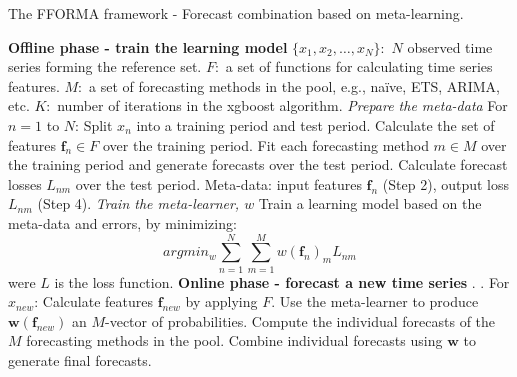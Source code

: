 \documentclass[11pt,a4paper,]{article}
\def\naive{na\"{i}ve}
\theoremstyle{definition}
\theoremstyle{definition}
\theoremstyle{definition}
\theoremstyle{remark}
\begin{document}
\begin{algorithm}[!ht]
  \caption{The FFORMA framework - Forecast combination based on meta-learning. }
  \label{alg:algo-lab}
  \begin{algorithmic}[1]
    \Statex \textbf{Offline phase - train the learning model}
    \Statex {}
    \Statex \hspace{1cm}$\{x_1, x_2, \dots,x_N\}:$ $N$ observed time series forming the reference set.
         \Statex \hspace{1cm}$F:$ a set of functions for calculating time series features.
         \Statex \hspace{1cm}$M:$ a set of forecasting methods in the pool, e.g., \naive, ETS, ARIMA, etc.
           \Statex \hspace{1cm}$K:$ number of iterations in the xgboost algorithm.
     \Statex {}
      \Statex \hspace{1cm}
      \Statex {}\vspace{0.3cm}
    \Statex \textit{Prepare the meta-data} \vspace{0.1cm}
    \Statex For $n=1$ to $N$:
            \State Split $x_n$ into a training period and test period.
            \State Calculate the set of features $\bm{f}_n\in F$ over the training period.
            \State Fit each forecasting method $m\in M$ over the training period and generate forecasts over the test period.
            \State Calculate forecast losses $L_{nm}$ over the test period.
    \State Meta-data: input features $\bm{f}_n$ (Step 2), output loss $L_{nm}$ (Step 4).
     \Statex
    \Statex \textit{Train the meta-learner, $w$}  \vspace{0.1cm}
            \State Train a learning model based on the meta-data and errors, by minimizing:
            $$ argmin_w \sum_{n=1}^N \sum_{m=1}^M w(\bm{f}_n)_{m} L_{nm}$$ were $L$ is the loss function.
    \Statex
     \Statex \textbf{Online phase - forecast a new time series}
    \Statex {}
    \Statex \hspace{1cm}.
     \Statex {}
      \Statex \hspace{1cm}.
      \Statex For $x_{new}$: 
  \State Calculate features $\bm{f}_{new}$ by applying $F$.
  \State Use the meta-learner to produce $\bm{w}(\bm{f}_{new})$ an $M$-vector of probabilities.
  \State Compute the individual forecasts of the $M$ forecasting methods in the pool.
  \State Combine individual forecasts using $\bm{w}$ to generate final forecasts.
   \end{algorithmic}

\end{algorithm}
\end{document}
